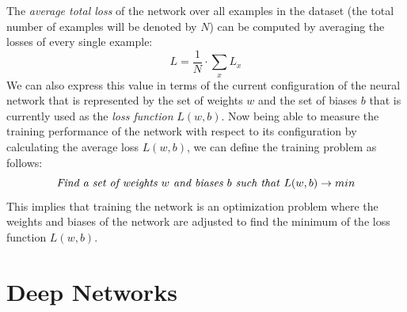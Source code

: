 The \textit{average total loss} of the network over all examples in
the dataset (the total number of examples will be denoted by \(N\))
can be computed by averaging the losses of every single example:
\begin{equation}
  L = \frac{1}{N} \cdot \sum_{x}{L_x}
\end{equation}
We can also express this value in terms of the current configuration
of the neural network that is represented by the set of weights \(w\)
and the set of biases \(b\) that is currently used as the \textit{loss
function} \(L(w, b)\).
Now being able to measure the training performance of the network with
respect to its configuration by
calculating the average loss \(L(w, b)\), we can define the training
problem as follows:
\begin{equation*}
  \text{\textit{Find a set of weights \(w\) and biases \(b\) such
      that} } L(w, b) \rightarrow min
\end{equation*}
This implies that training the network is an optimization
problem where the weights and biases of the network are
adjusted to find the minimum of the loss function \(L(w, b)\).

\section{Deep Networks}
